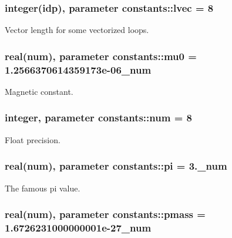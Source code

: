 \subsubsection[{\texorpdfstring{lvec}{lvec}}]{\setlength{\rightskip}{0pt plus 5cm}integer({\bf idp}), parameter constants\+::lvec = 8}\hypertarget{namespaceconstants_a68354913203e3e01c9b0b547e9d95aae}{}\label{namespaceconstants_a68354913203e3e01c9b0b547e9d95aae}


Vector length for some vectorized loops. 

\subsubsection[{\texorpdfstring{mu0}{mu0}}]{\setlength{\rightskip}{0pt plus 5cm}real({\bf num}), parameter constants\+::mu0 = 1.\+2566370614359173e-\/06\+\_\+num}\hypertarget{namespaceconstants_adf2453bfeefbefa1135a81f4ddfe4d6d}{}\label{namespaceconstants_adf2453bfeefbefa1135a81f4ddfe4d6d}


Magnetic constant. 

\subsubsection[{\texorpdfstring{num}{num}}]{\setlength{\rightskip}{0pt plus 5cm}integer, parameter constants\+::num = 8}\hypertarget{namespaceconstants_afe19f7f8af171411c51fb763b36e3823}{}\label{namespaceconstants_afe19f7f8af171411c51fb763b36e3823}


Float precision. 

\subsubsection[{\texorpdfstring{pi}{pi}}]{\setlength{\rightskip}{0pt plus 5cm}real({\bf num}), parameter constants\+::pi = 3.\+\_\+num}\hypertarget{namespaceconstants_a736c2860cb0585043ad4abcd1c3352b1}{}\label{namespaceconstants_a736c2860cb0585043ad4abcd1c3352b1}


The famous pi value. 

\subsubsection[{\texorpdfstring{pmass}{pmass}}]{\setlength{\rightskip}{0pt plus 5cm}real({\bf num}), parameter constants\+::pmass = 1.\+6726231000000001e-\/27\+\_\+num}\hypertarget{namespaceconstants_a44f3d8cbf9c39db63d7533d985cc51c3}{}\label{namespaceconstants_a44f3d8cbf9c39db63d7533d985cc51c3}


